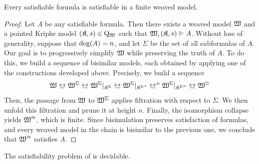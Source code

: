 \begin{theorem}
    Every satisfiable formula is satisfiable in a finite weaved model.
\end{theorem}
\begin{proof}
    Let $A$ be any satisfiable formula.
    Then there exists a weaved model $\mathfrak{W}$ and a pointed Kripke model $(\mathfrak{K},s) \in \mathrm{Q}_{\mathfrak{W}_{}}$ such that ${\mathfrak{W},(\mathfrak{K},s)}\Vdash{A}$.
    Without loss of generality, suppose that $\operatorname{deg}(A) = n$, and let $\Sigma$ be the set of all subformulas of $A$.
    Our goal is to progressively simplify $\mathfrak{W}$ while preserving the truth of $A$. To do this, we build a sequence of bisimilar models, each obtained by applying one of the constructions developed above.
    Precisely, we build a sequence
    \[\wmodel \bisim {\fwmodel} \bisim {\restr{\fwmodel}{\fmodel}} \bisim {\restr{\fwmodel}{{\fmodel}^{*}}} \bisim^{n} {\restr{\fwmodel}{{\fmodel}^{n}}} \bisim \iwmodel\]
    Then, the passage from $\mathfrak{W}$ to $\mathfrak{W}^{\Sigma}$ applies filtration with respect to $\Sigma$.
    We then unfold this filtration and prune it at height $n$.
    Finally, the isomorphism collapse yields $\mathfrak{W}^{\cong}$, which is finite.
    Since bisimulation preserves satisfaction of formulas, and every weaved model in the chain is bisimilar to the previous one, we conclude that $\mathfrak{W}^{\cong}$ satisfies $A$.
\end{proof}

\begin{corollary}
    The satisfiability problem of \iml is decidable.
\end{corollary}

